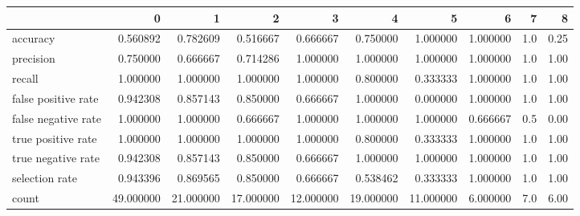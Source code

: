\begin{tabular}{lrrrrrrrrr}
\toprule
{} &          0 &          1 &          2 &          3 &          4 &          5 &         6 &    7 &     8 \\
\midrule
accuracy            &   0.560892 &   0.782609 &   0.516667 &   0.666667 &   0.750000 &   1.000000 &  1.000000 &  1.0 &  0.25 \\
precision           &   0.750000 &   0.666667 &   0.714286 &   1.000000 &   1.000000 &   1.000000 &  1.000000 &  1.0 &  1.00 \\
recall              &   1.000000 &   1.000000 &   1.000000 &   1.000000 &   0.800000 &   0.333333 &  1.000000 &  1.0 &  1.00 \\
false positive rate &   0.942308 &   0.857143 &   0.850000 &   0.666667 &   1.000000 &   0.000000 &  1.000000 &  1.0 &  1.00 \\
false negative rate &   1.000000 &   1.000000 &   0.666667 &   1.000000 &   1.000000 &   1.000000 &  0.666667 &  0.5 &  0.00 \\
true positive rate  &   1.000000 &   1.000000 &   1.000000 &   1.000000 &   0.800000 &   0.333333 &  1.000000 &  1.0 &  1.00 \\
true negative rate  &   0.942308 &   0.857143 &   0.850000 &   0.666667 &   1.000000 &   1.000000 &  1.000000 &  1.0 &  1.00 \\
selection rate      &   0.943396 &   0.869565 &   0.850000 &   0.666667 &   0.538462 &   0.333333 &  1.000000 &  1.0 &  1.00 \\
count               &  49.000000 &  21.000000 &  17.000000 &  12.000000 &  19.000000 &  11.000000 &  6.000000 &  7.0 &  6.00 \\
\bottomrule
\end{tabular}
